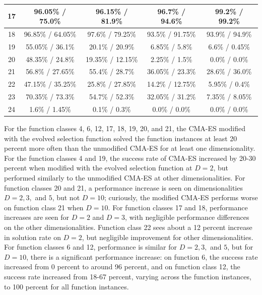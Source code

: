 \documentclass[sigconf]{acmart}
\begin{document}
\begin{table}
\begin{tabular}{c|c|c|c|c}
		\hline
		17 &  96.05\% / 75.0\%  &  96.15\% / 81.9\%  &  96.7\% / 94.6\%  &  99.2\% / 99.2\% \\
		\hline
		18 &  96.85\% / 64.05\%  &  97.6\% / 79.25\%  &  93.5\% / 91.75\%  &  93.9\% / 94.9\% \\
		\hline				
		19 &  55.05\% / 36.1\%  &  20.1\% / 20.9\%  &  6.85\% / 5.8\%  &  6.6\% / 0.45\% \\
		\hline
		20 &  48.35\% / 24.8\%  &  19.35\% / 12.15\%  &  2.25\% / 1.5\%  &  0.0\% / 0.0\% \\
		\hline
		21 &  56.8\% / 27.65\%  &  55.4\% / 28.7\%  &  36.05\% / 23.3\%  &  28.6\% / 36.0\% \\
		\hline
		22 &  47.15\% / 35.25\%  &  25.8\% / 27.85\%  &  14.2\% / 12.75\%  &  5.95\% / 0.4\% \\
		\hline		
		23 &  70.35\% / 73.3\%  &  54.7\% / 52.3\%  &  32.05\% / 31.2\%  &  7.35\% / 8.05\% \\
		\hline
		24 &  1.6\% / 1.45\%  &  0.1\% / 0.3\%  &  0.0\% / 0.0\%  &  0.0\% / 0.0\% \\
		
		\bottomrule
	\end{tabular}
\end{table}

For the function classes 4, 6, 12, 17, 18, 19, 20, and 21, the CMA-ES modified with the evolved selection function solved the function instances at least 20 percent more often than the unmodified CMA-ES for at least one dimensionality. For the function classes 4 and 19, the success rate of CMA-ES increased by 20-30 percent when modified with the evolved selection function at $D=2$, but performed similarly to the unmodified CMA-ES at other dimensionalities. For function classes 20 and 21, a performance increase is seen on dimensionalities $D=2, 3,$ and $5$, but not $D=10$; curiously, the modified CMA-ES performs worse on function class 21 when $D=10$. For function classes 17 and 18, performance increases are seen for $D=2$ and $D=3$, with negligible performance differences on the other dimensionalities. Function class 22 sees about a 12 percent increase in solution rate on $D=2$, but negligible improvement for other dimensionalities. For function classes 6 and 12, performance is similar for $D=2, 3,$ and $5$, but for $D=10$, there is a significant performance increase: on function 6, the success rate increased from 0 percent to around 96 percent, and on function class 12, the success rate increased from 18-67 percent, varying across the function instances, to 100 percent for all function instances.
\end{document}
